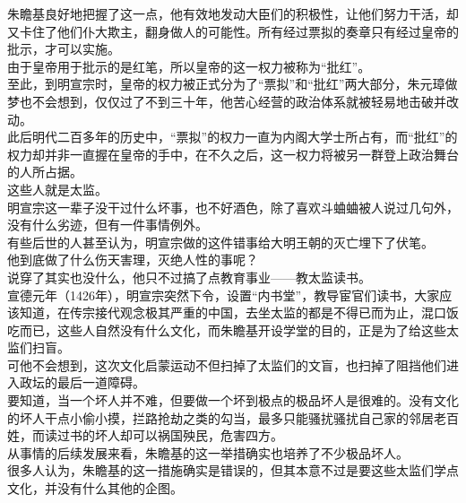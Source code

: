 \begin{multicols}{\theparacolNo}
朱瞻基良好地把握了这一点，他有效地发动大臣们的积极性，让他们努力干活，却又卡住了他们仆大欺主，翻身做人的可能性。所有经过票拟的奏章只有经过皇帝的批示，才可以实施。\\

由于皇帝用于批示的是红笔，所以皇帝的这一权力被称为“批红”。\\

至此，到明宣宗时，皇帝的权力被正式分为了“票拟”和“批红”两大部分，朱元璋做梦也不会想到，仅仅过了不到三十年，他苦心经营的政治体系就被轻易地击破并改动。\\

此后明代二百多年的历史中，“票拟”的权力一直为内阁大学士所占有，而“批红”的权力却并非一直握在皇帝的手中，在不久之后，这一权力将被另一群登上政治舞台的人所占据。\\

这些人就是太监。\\

明宣宗这一辈子没干过什么坏事，也不好酒色，除了喜欢斗蛐蛐被人说过几句外，没有什么劣迹，但有一件事情例外。\\

有些后世的人甚至认为，明宣宗做的这件错事给大明王朝的灭亡埋下了伏笔。\\

他到底做了什么伤天害理，灭绝人性的事呢？\\

说穿了其实也没什么，他只不过搞了点教育事业——教太监读书。\\

宣德元年（1426年），明宣宗突然下令，设置“内书堂”，教导宦官们读书，大家应该知道，在传宗接代观念极其严重的中国，去坐太监的都是不得已而为止，混口饭吃而已，这些人自然没有什么文化，而朱瞻基开设学堂的目的，正是为了给这些太监们扫盲。\\

可他不会想到，这次文化启蒙运动不但扫掉了太监们的文盲，也扫掉了阻挡他们进入政坛的最后一道障碍。\\

要知道，当一个坏人并不难，但要做一个坏到极点的极品坏人是很难的。没有文化的坏人干点小偷小摸，拦路抢劫之类的勾当，最多只能骚扰骚扰自己家的邻居老百姓，而读过书的坏人却可以祸国殃民，危害四方。\\

从事情的后续发展来看，朱瞻基的这一举措确实也培养了不少极品坏人。\\

很多人认为，朱瞻基的这一措施确实是错误的，但其本意不过是要这些太监们学点文化，并没有什么其他的企图。\\


\end{multicols}
